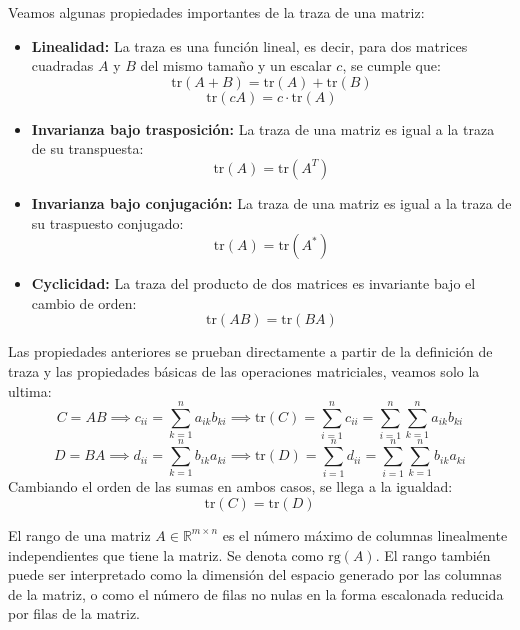 \begin{proposición}
    Veamos algunas propiedades importantes de la traza de una matriz:
    \begin{itemize}
        \item \textbf{Linealidad:} La traza es una función lineal, es decir, para dos matrices cuadradas \( A \) y \( B \) del mismo tamaño y un escalar \( c \), se cumple que:
        \[
            \text{tr}(A + B) = \text{tr}(A) + \text{tr}(B)
        \]
        \[
            \text{tr}(cA) = c \cdot \text{tr}(A)
        \]
        \item \textbf{Invarianza bajo trasposición:} La traza de una matriz es igual a la traza de su transpuesta:
        \[
            \text{tr}(A) = \text{tr}(A^T)
        \]
        \item \textbf{Invarianza bajo conjugación:} La traza de una matriz es igual a la traza de su traspuesto conjugado:
        \[
            \text{tr}(A) = \text{tr}(A^*)
        \]
        \item \textbf{Cyclicidad:} La traza del producto de dos matrices es invariante bajo el cambio de orden:
        \[
            \text{tr}(AB) = \text{tr}(BA)
        \]
    \end{itemize}
    Las propiedades anteriores se prueban directamente a partir de la definición de traza y las propiedades básicas de las operaciones matriciales, veamos solo la ultima:
    \[
        C = AB \implies
        c_{ii} = \sum_{k=1}^{n} a_{ik} b_{ki} \implies
        \text{tr}(C) = \sum_{i=1}^{n} c_{ii} = 
        \sum_{i=1}^{n} \sum_{k=1}^{n} a_{ik} b_{ki}
    \]
    \[
        D = BA \implies
        d_{ii} = \sum_{k=1}^{n} b_{ik} a_{ki} \implies
        \text{tr}(D) = \sum_{i=1}^{n} d_{ii} = 
        \sum_{i=1}^{n} \sum_{k=1}^{n} b_{ik} a_{ki}
    \]
    Cambiando el orden de las sumas en ambos casos, se llega a la igualdad:
    \[
        \text{tr}(C) = \text{tr}(D)
    \]
\end{proposición}

\begin{definición}
    El rango de una matriz \( A \in \mathbb{R}^{m \times n} \) es el número máximo de columnas linealmente independientes que tiene la matriz. Se denota como \( \text{rg}(A) \). El rango también puede ser interpretado como la dimensión del espacio generado por las columnas de la matriz, o como el número de filas no nulas en la forma escalonada reducida por filas de la matriz.
\end{definición}

